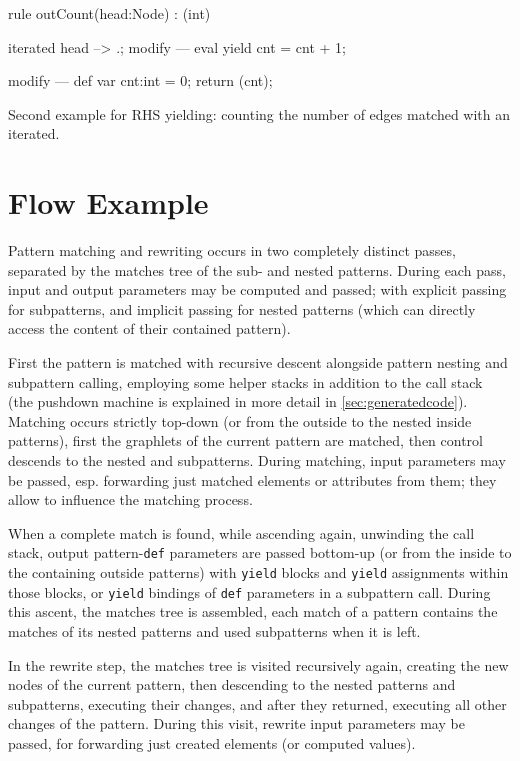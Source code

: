 \begin{example}
  \begin{grgen}
rule outCount(head:Node) : (int)
{
  iterated {
    head --> .;
    modify {
    ---
      eval { yield cnt = cnt + 1; }
    }
  }

  modify {
  ---
    def var cnt:int = 0;
    return (cnt);
  }
}
  \end{grgen}
  Second example for RHS yielding: counting the number of edges matched with an iterated.
\end{example}



\section{Flow Example}\label{matchingflow}

Pattern matching and rewriting occurs in two completely distinct passes, separated by the matches tree of the sub- and nested patterns.
During each pass, input and output parameters may be computed and passed; with explicit passing for subpatterns, and implicit passing for nested patterns (which can directly access the content of their contained pattern).

First the pattern is matched with recursive descent alongside pattern nesting and subpattern calling, employing some helper stacks in addition to the call stack (the pushdown machine is explained in more detail in \ref{sec:generatedcode}).
Matching occurs strictly top-down (or from the outside to the nested inside patterns), first the graphlets of the current pattern are matched, then control descends to the nested and subpatterns.
During matching, input parameters may be passed, esp. forwarding just matched elements or attributes from them; they allow to influence the matching process.

When a complete match is found, while ascending again, unwinding the call stack, output pattern-\texttt{def} parameters are passed bottom-up (or from the inside to the containing outside patterns) with \texttt{yield} blocks and \texttt{yield} assignments within those blocks, or \texttt{yield} bindings of \texttt{def} parameters in a subpattern call.
During this ascent, the matches tree is assembled, each match of a pattern contains the matches of its nested patterns and used subpatterns when it is left.

In the rewrite step, the matches tree is visited recursively again, creating the new nodes of the current pattern, then descending to the nested patterns and subpatterns, executing their changes, and after they returned, executing all other changes of the pattern.
During this visit, rewrite input parameters may be passed, for forwarding just created elements (or computed values). 

